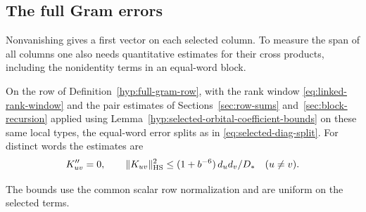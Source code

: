 \subsection{The full Gram errors}
\label{subsec:full-gram-errors}

Nonvanishing gives a first vector on each selected column. To measure the span of all columns one also needs quantitative estimates for their cross products, including the nonidentity terms in an equal-word block.

\begin{proposition}\label{prop:selected-full-gram}
On the row of Definition~\ref{hyp:full-gram-row}, with the rank window
\eqref{eq:linked-rank-window} and the pair estimates of
Sections~\ref{sec:row-sums} and~\ref{sec:block-recursion} applied using
Lemma~\ref{hyp:selected-orbital-coefficient-bounds} on these same local types,
the equal-word error splits as in \eqref{eq:selected-diag-split}.
For distinct words the estimates are 
\[
 K''_{uv}=0,\qquad \|K_{uv}\|_{\rm HS}^2\le(1+b^{-6})\,d_ud_v/D_*\quad(u\ne v).
\]

The bounds use the common scalar row normalization and are
uniform on the selected terms.
\end{proposition}

